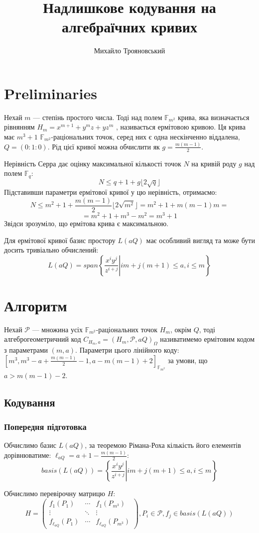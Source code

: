 \documentclass[a4paper,12pt,oneside]{article}
\title{Надлишкове кодування на алгебраїчних кривих}
\author{Михайло Трояновський}
\begin{document}
\section{Preliminaries}
Нехай $m$ --- степінь простого числа. Тоді над полем $\mathbb{F}_{m^2}$ крива, яка визначається рівнянням $H_m = x^{m+1} + y^m z + y z^m$ ,
називається ермітовою кривою. Ця крива має $m^3+1$ $\mathbb{F}_{m^2}$-раціональних точок, серед них є одна нескінченно віддалена, 
$Q = (0:1:0)$. Рід цієї кривої можна обчислити як $g = \frac{m(m-1)}{2}$.

Нерівність Серра дає оцінку максимальної кількості точок $N$ на кривій роду $g$ над полем $\mathbb{F}_q$:
$$ N \le q+1+g \lfloor 2 \sqrt{q} \rfloor $$
Підставивши параметри ермітової кривої у цю нерівність, отримаємо:
$$ N \le m^2 + 1 + \frac{m(m-1)}{2} \lfloor 2 \sqrt{m^2} \rfloor= m^2 + 1 + m(m-1)m = $$
$$ = m^2 + 1 + m^3 - m^2 = m^3 + 1$$
Звідси зрозуміло, що ермітова крива є максимальною.

Для ермітової кривої базис простору $L(aQ)$ має особливий вигляд та може бути досить тривіально обчислений:
$$ L(aQ) = span \left. \left \{ \frac{x^i y^j}{z^{i+j}} \right | i m + j (m + 1) \le a, i \le m \right \} $$


\section{Алгоритм}
Нехай $\mathcal{P}$ --- множина усіх $\mathbb{F}_{m^2}$-раціональних точок $H_m$, окрім $Q$, тоді алгеброгеометричний код 
$C_{H_{m}, a} = (H_m, \mathcal{P}, aQ)_\Omega$ називатимемо ермітовим кодом з параметрами $(m, a)$. Параметри цього лінійного коду:
$[m^3, m^3 - a + \frac{m(m-1)}{2} - 1, a - m(m-1) + 2]_{\mathbb{F}_{m^2}}$ за умови, що $ a > m(m-1) - 2$.
\subsection{Кодування}
\subsubsection{Попередня підготовка}
Обчислимо базис $L(aQ)$, за теоремою Рімана-Роха кількість його елементів дорівнюватиме: $\ell_{aQ}=a+1-\frac{m(m-1)}{2}$:
$$ basis(L(aQ)) = \left. \left \{ \frac{x^i y^j}{z^{i+j}} \right | i m + j (m + 1) \le a, i \le m \right \} $$

Обчислимо перевірочну матрицю $H$:
$$ 
H = 
\begin{pmatrix}
 f_1 (P_1) & \cdots & f_1(P_{m^3}) \\
 \vdots & \ddots & \vdots \\
 f_{\ell_{aQ}} (P_1) & \cdots & f_{\ell_{aQ}}(P_{m^3})
\end{pmatrix}, P_i \in \mathcal{P}, f_j \in basis(L(aQ))
$$
\end{document}
